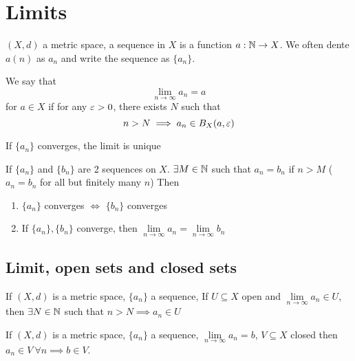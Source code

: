 \chapter{Limits}

\begin{definition}
  $(X, d)$ a metric space, a sequence in $X$ is a function $a : \mathbb N \to X$.
  We often dente $a(n)$ as $a_n$ and write the sequence as $\{a_n\}$.
\end{definition}

\begin{definition}
  We say that 
  \[
    \lim\limits_{n \to \infty} a_n = a
    \]
  for $a \in X$ if for any $\varepsilon > 0$, there exists $N$ such that 
  \[n > N \implies a_n \in B_X(a, \varepsilon)\]
\end{definition}

\begin{theorem}
  If $\{a_n\}$ converges, the limit is unique
\end{theorem}

\begin{theorem}
  If $\{a_n\}$ and $\{b_n\}$ are 2 sequences on $X$.
  $\exists M \in \mathbb N$ such that $a_n = b_n$ if $n > M$
  ($a_n = b_n$ for all but finitely many $n$)
  Then
  \begin{enumerate}
    \item $\{a_n\}$ converges $\iff$ $\{b_n\}$ converges
    \item If $\{a_n\}, \{b_n\}$ converge, then $\lim\limits_{n \to \infty} a_n = \lim\limits_{n \to \infty} b_n$
  \end{enumerate}
\end{theorem}

\section{Limit, open sets and closed sets}

\begin{theorem}
  If $(X, d)$ is a metric space, $\{a_n\}$ a sequence, If $U \subseteq X$ open
  and $\lim\limits_{n \to \infty} a_n \in U$, then $\exists N \in \mathbb N$ such that 
  $n > N \implies a_n \in U$ 
\end{theorem}

\begin{theorem}
  If $(X, d)$ is a metric space, $\{a_n\}$ a sequence, $\lim\limits_{n \to \infty} a_n = b$,
  $V \subseteq X$ closed then $a_n \in V\ \forall n \implies b \in V$.
\end{theorem}

